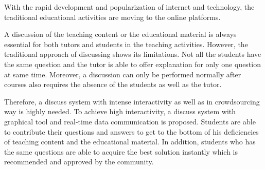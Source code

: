 With the rapid development and popularization of internet and technology, the traditional educational activities are moving to the online platforms.

A discussion of the teaching content or the educational material is always essential for both tutors and students in the teaching activities. However, the traditional approach of discussing shows its limitations. Not all the students have the same question and the tutor is able to offer explanation for only one question at same time. Moreover, a discussion can only be performed normally after courses also requires the absence of the students as well as the tutor.

Therefore, a discuss system with intense interactivity as well as in crowdsourcing way is highly needed. To achieve high interactivity, a discuss system with graphical tool and real-time data communication is proposed. Students are able to contribute their questions and answers to get to the bottom of his deficiencies of teaching content and the educational material. In addition, students who has the same questions are able to  acquire the best solution instantly which is recommended and approved by the community.
